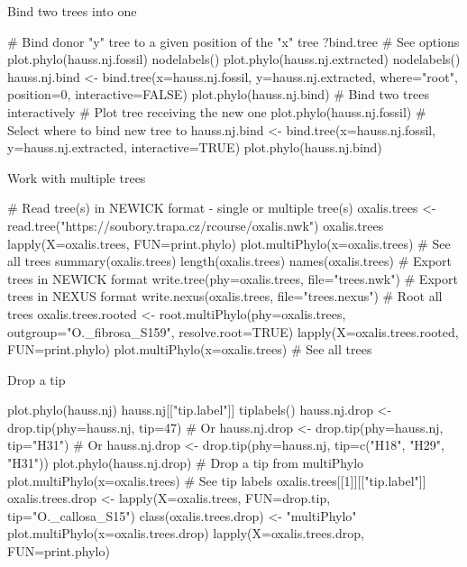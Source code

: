 \documentclass[compress, xelatex, 11pt, xcolor=svgnames, aspectratio=169,
	hyperref={
		bookmarks=true,
		unicode=true,
		colorlinks=true,
		pdftitle={Molecular data in R},
		plainpages=false,
		pdfauthor={Vojtech Zeisek},
		pdfsubject={Course about phylogeny and evolution in R},
		pdfcreator={XeLaTeX},
		pdfkeywords={R, evolution, phylogeny, molecular data},
		linkcolor=Crimson, %
		anchorcolor=Magenta, %
		citecolor=Magenta, %
		filecolor=Magenta, %
		menucolor=Magenta, %
		urlcolor=DodgerBlue, %
		},
	url={hyphens, lowtilde} %
	]{beamer}
\begin{document}
\begin{frame}[fragile]{Bind two trees into one}
	\begin{spluscode}
    # Bind donor "y" tree to a given position of the "x" tree
    ?bind.tree # See options
    plot.phylo(hauss.nj.fossil)
    nodelabels()
    plot.phylo(hauss.nj.extracted)
    nodelabels()
    hauss.nj.bind <- bind.tree(x=hauss.nj.fossil, y=hauss.nj.extracted,
      where="root", position=0, interactive=FALSE)
    plot.phylo(hauss.nj.bind)
    # Bind two trees interactively
    # Plot tree receiving the new one
    plot.phylo(hauss.nj.fossil)
    # Select where to bind new tree to
    hauss.nj.bind <- bind.tree(x=hauss.nj.fossil, y=hauss.nj.extracted,
      interactive=TRUE)
    plot.phylo(hauss.nj.bind)
	\end{spluscode}
\end{frame}

\begin{frame}[fragile]{Work with multiple trees}
	\begin{spluscode}
    # Read tree(s) in NEWICK format - single or multiple tree(s)
    oxalis.trees <- read.tree("https://soubory.trapa.cz/rcourse/oxalis.nwk")
    oxalis.trees
    lapply(X=oxalis.trees, FUN=print.phylo)
    plot.multiPhylo(x=oxalis.trees) # See all trees
    summary(oxalis.trees)
    length(oxalis.trees)
    names(oxalis.trees)
    # Export trees in NEWICK format
    write.tree(phy=oxalis.trees, file="trees.nwk")
    # Export trees in NEXUS format
    write.nexus(oxalis.trees, file="trees.nexus")
    # Root all trees
    oxalis.trees.rooted <- root.multiPhylo(phy=oxalis.trees,
      outgroup="O._fibrosa_S159", resolve.root=TRUE)
    lapply(X=oxalis.trees.rooted, FUN=print.phylo)
    plot.multiPhylo(x=oxalis.trees) # See all trees
	\end{spluscode}
\end{frame}

\begin{frame}[fragile]{Drop a tip}
	\begin{spluscode}
    plot.phylo(hauss.nj)
    hauss.nj[["tip.label"]]
    tiplabels()
    hauss.nj.drop <- drop.tip(phy=hauss.nj, tip=47) # Or
    hauss.nj.drop <- drop.tip(phy=hauss.nj, tip="H31") # Or
    hauss.nj.drop <- drop.tip(phy=hauss.nj, tip=c("H18", "H29", "H31"))
    plot.phylo(hauss.nj.drop)
    # Drop a tip from multiPhylo
    plot.multiPhylo(x=oxalis.trees)
    # See tip labels
    oxalis.trees[[1]][["tip.label"]]
    oxalis.trees.drop <- lapply(X=oxalis.trees, FUN=drop.tip,
      tip="O._callosa_S15")
    class(oxalis.trees.drop) <- "multiPhylo"
    plot.multiPhylo(x=oxalis.trees.drop)
    lapply(X=oxalis.trees.drop, FUN=print.phylo)
	\end{spluscode}
\end{frame}
\end{document}
